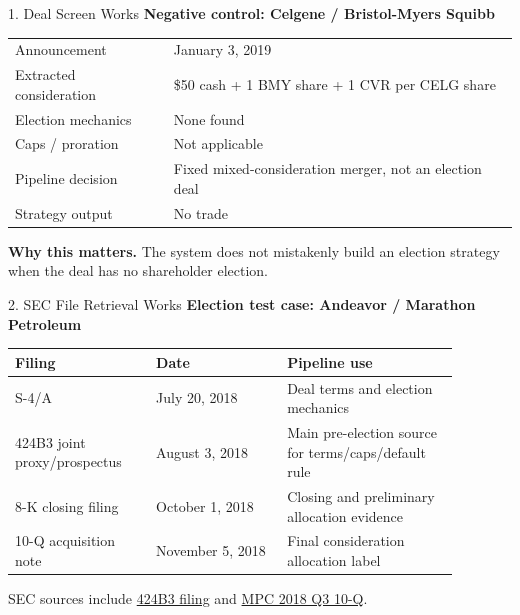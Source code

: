 \documentclass[aspectratio=169,11pt]{beamer}
\newcommand{\usd}[1]{\$#1}
\begin{document}
\begin{frame}{1. Deal Screen Works}
\small
\textbf{Negative control: Celgene / Bristol-Myers Squibb}

\vspace{0.5em}
\begin{tabular}{ll}
\toprule
Announcement & January 3, 2019 \\
Extracted consideration & \usd{50} cash + 1 BMY share + 1 CVR per CELG share \\
Election mechanics & None found \\
Caps / proration & Not applicable \\
Pipeline decision & Fixed mixed-consideration merger, not an election deal \\
Strategy output & No trade \\
\bottomrule
\end{tabular}

\vspace{0.8em}
\textbf{Why this matters.} The system does not mistakenly build an election strategy when the deal has no shareholder election.
\end{frame}

\begin{frame}{2. SEC File Retrieval Works}
\small
\textbf{Election test case: Andeavor / Marathon Petroleum}

\vspace{0.5em}
\begin{tabular}{p{0.28\linewidth}p{0.26\linewidth}p{0.34\linewidth}}
\toprule
\textbf{Filing} & \textbf{Date} & \textbf{Pipeline use} \\
\midrule
S-4/A & July 20, 2018 & Deal terms and election mechanics \\
424B3 joint proxy/prospectus & August 3, 2018 & Main pre-election source for terms/caps/default rule \\
8-K closing filing & October 1, 2018 & Closing and preliminary allocation evidence \\
10-Q acquisition note & November 5, 2018 & Final consideration allocation label \\
\bottomrule
\end{tabular}

\vspace{0.7em}
\scriptsize
SEC sources include \href{https://www.sec.gov/Archives/edgar/data/1510295/000119312518238270/0001193125-18-238270.txt}{424B3 filing} and \href{https://www.sec.gov/Archives/edgar/data/1510295/000151029518000215/mpc-20180930x10q.htm}{MPC 2018 Q3 10-Q}.
\end{frame}
\end{document}
